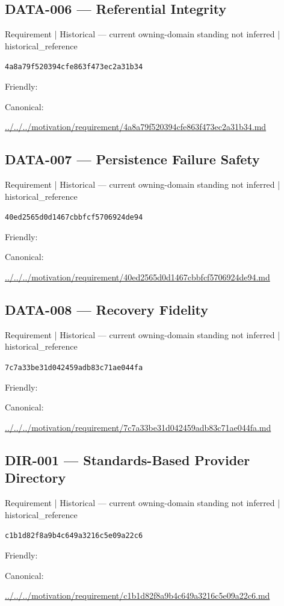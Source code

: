 \documentclass[10pt,a4paper]{article}
\begin{document}
\subsection*{DATA-006 — Referential Integrity}
{\small Requirement | Historical — current owning-domain standing not inferred | historical\_reference}\par
\texttt{4a8a79f520394cfe863f473ec2a31b34}\par
Friendly: \par
Canonical: \par
{\footnotesize\url{../../../motivation/requirement/4a8a79f520394cfe863f473ec2a31b34.md}}\par
\subsection*{DATA-007 — Persistence Failure Safety}
{\small Requirement | Historical — current owning-domain standing not inferred | historical\_reference}\par
\texttt{40ed2565d0d1467cbbfcf5706924de94}\par
Friendly: \par
Canonical: \par
{\footnotesize\url{../../../motivation/requirement/40ed2565d0d1467cbbfcf5706924de94.md}}\par
\subsection*{DATA-008 — Recovery Fidelity}
{\small Requirement | Historical — current owning-domain standing not inferred | historical\_reference}\par
\texttt{7c7a33be31d042459adb83c71ae044fa}\par
Friendly: \par
Canonical: \par
{\footnotesize\url{../../../motivation/requirement/7c7a33be31d042459adb83c71ae044fa.md}}\par
\subsection*{DIR-001 — Standards-Based Provider Directory}
{\small Requirement | Historical — current owning-domain standing not inferred | historical\_reference}\par
\texttt{c1b1d82f8a9b4c649a3216c5e09a22c6}\par
Friendly: \par
Canonical: \par
{\footnotesize\url{../../../motivation/requirement/c1b1d82f8a9b4c649a3216c5e09a22c6.md}}\par
\end{document}
